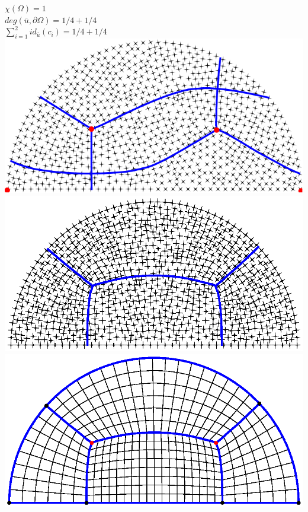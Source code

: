 \documentclass[compress,10pt,aspectratio=169]{beamer}
\begin{document}
\begin{frame}%
\vspace{-0.28cm}
\begin{columns}
\begin{column}{0.4\textwidth}
    \centering
    \scriptsize
    $\chi(\Omega)=1$\\\vspace{0.1cm}
    $deg(\bar{u}, \partial\Omega) = 1/4+1/4$\\\vspace{0.1cm}
    $\sum_{i=1}^{2} id_{\bar{u}}(c_i)=1/4+1/4$\\\vspace{0.1cm}
    \includegraphics[scale=0.32]{images/demiDiscValPropNonAligne.pdf}\\\vspace{0.1cm}
    \includegraphics[scale=0.32]{images/demiDiscValPropAligne.eps}\\\vspace{0.1cm}
    \includegraphics[scale=0.32]{images/mailDemiDisc.eps}\\

\end{column}
\end{columns}
\end{frame}
\end{document}
